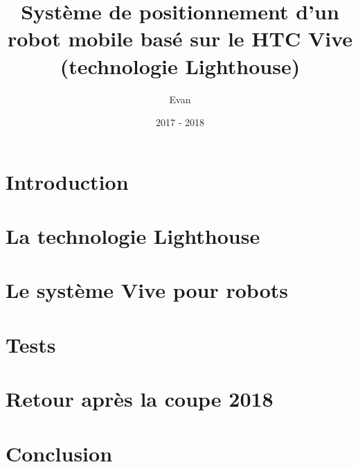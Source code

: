 \documentclass[10pt,a4paper,french]{report}
\title{Système de positionnement d'un robot mobile basé sur le HTC Vive (technologie Lighthouse)}
\author{Evan \bsc{Roué}}
\date{2017 - 2018}
\begin{document}
\maketitle



\tableofcontents

\thispagestyle{empty}
\setcounter{page}{0}

\chapter{Introduction}


\chapter{La technologie Lighthouse}


\chapter{Le système Vive pour robots}


\chapter{Tests}


\chapter{Retour après la coupe 2018}


\chapter{Conclusion}

\end{document}
